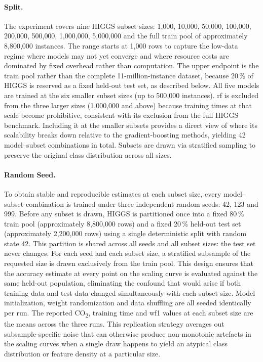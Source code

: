 \paragraph{Split.}
The experiment covers nine HIGGS subset sizes: 1{,}000, 10{,}000, 50{,}000, 100{,}000, 200{,}000, 500{,}000, 1{,}000{,}000, 5{,}000{,}000 and the full train pool of approximately 8{,}800{,}000 instances. The range starts at 1{,}000 rows to capture the low-data regime where models may not yet converge and where resource costs are dominated by fixed overhead rather than computation. The upper endpoint is the train pool rather than the complete 11-million-instance dataset, because 20\,\% of HIGGS is reserved as a fixed held-out test set, as described below. All five models are trained at the six smaller subset sizes (up to 500{,}000 instances). \gls{rf} is excluded from the three larger sizes (1{,}000{,}000 and above) because training times at that scale become prohibitive, consistent with its exclusion from the full HIGGS benchmark. Including it at the smaller subsets provides a direct view of where its scalability breaks down relative to the gradient-boosting methods, yielding 42 model--subset combinations in total. Subsets are drawn via stratified sampling to preserve the original class distribution across all sizes.

\paragraph{Random Seed.}
To obtain stable and reproducible estimates at each subset size, every model--subset combination is trained under three independent random seeds: 42, 123 and 999. Before any subset is drawn, HIGGS is partitioned once into a fixed 80\,\% train pool (approximately 8{,}800{,}000 rows) and a fixed 20\,\% held-out test set (approximately 2{,}200{,}000 rows) using a single deterministic split with random state 42. This partition is shared across all seeds and all subset sizes: the test set never changes. For each seed and each subset size, a stratified subsample of the requested size is drawn exclusively from the train pool. This design ensures that the accuracy estimate at every point on the scaling curve is evaluated against the same held-out population, eliminating the confound that would arise if both training data and test data changed simultaneously with each subset size. Model initialization, weight randomization and data shuffling are all seeded identically per run. The reported CO\textsubscript{2}, training time and \gls{wf1} values at each subset size are the means across the three runs. This replication strategy averages out subsample-specific noise that can otherwise produce non-monotonic artefacts in the scaling curves when a single draw happens to yield an atypical class distribution or feature density at a particular size.

